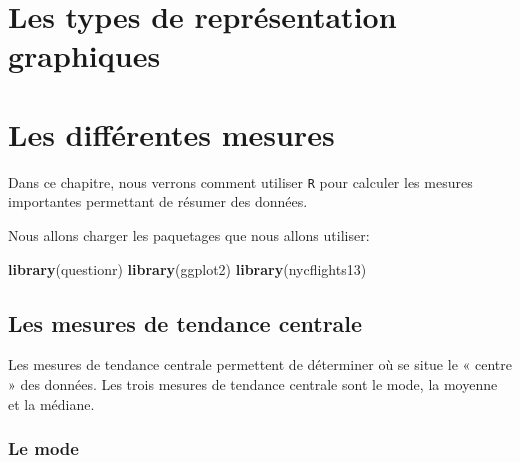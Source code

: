 \documentclass[]{book}
\newenvironment{Shaded}{\begin{snugshade}}{\end{snugshade}}
\newcommand{\DecValTok}[1]{\textcolor[rgb]{0.00,0.00,0.81}{#1}}
\newcommand{\KeywordTok}[1]{\textcolor[rgb]{0.13,0.29,0.53}{\textbf{#1}}}
\newcommand{\NormalTok}[1]{#1}
\newcommand{\OperatorTok}[1]{\textcolor[rgb]{0.81,0.36,0.00}{\textbf{#1}}}
\theoremstyle{definition}
\theoremstyle{definition}
\theoremstyle{definition}
\theoremstyle{remark}
\begin{document}
\begin{Shaded}
\end{Shaded}

\hypertarget{graphiques}{%
\chapter{Les types de représentation graphiques}\label{graphiques}}

\hypertarget{mesures}{%
\chapter{Les différentes mesures}\label{mesures}}

Dans ce chapitre, nous verrons comment utiliser \texttt{R} pour calculer
les mesures importantes permettant de résumer des données.

Nous allons charger les paquetages que nous allons utiliser:

\begin{Shaded}
\begin{Highlighting}[]
\KeywordTok{library}\NormalTok{(questionr)}
\KeywordTok{library}\NormalTok{(ggplot2)}
\KeywordTok{library}\NormalTok{(nycflights13)}
\end{Highlighting}
\end{Shaded}

\hypertarget{les-mesures-de-tendance-centrale}{%
\section{Les mesures de tendance
centrale}\label{les-mesures-de-tendance-centrale}}

Les mesures de tendance centrale permettent de déterminer où se situe le
« centre » des données. Les trois mesures de tendance centrale sont le
mode, la moyenne et la médiane.

\hypertarget{le-mode}{%
\subsection{Le mode}\label{le-mode}}
\end{document}
